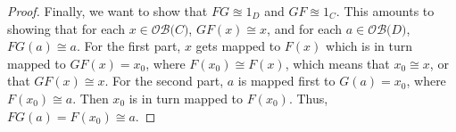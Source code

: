 \documentclass[12pt]{article}
\newcommand{\eqv}{\approxeq}
\newcommand{\ob}[1]{\mathcal{OB}{#1}}
\begin{document}
\begin{proof}
Finally, we want to show that $FG\eqv 1_D$ and $GF\eqv 1_C$.
This amounts to showing that for each $x\in\ob(C)$, $GF(x)\cong x$,
and for each $a\in\ob(D)$, $FG(a)\cong a$. For the first part, $x$
gets mapped to $F(x)$ which is in turn mapped to $GF(x)=x_0$, where
$F(x_0)\cong F(x)$, which means that $x_0\cong x$, or that
$GF(x)\cong x$. For the second part, $a$ is mapped first to
$G(a)=x_0$, where $F(x_0)\cong a$. Then $x_0$ is in turn mapped to
$F(x_0)$. Thus, $FG(a)=F(x_0)\cong a$.
\end{proof}
\end{document}
